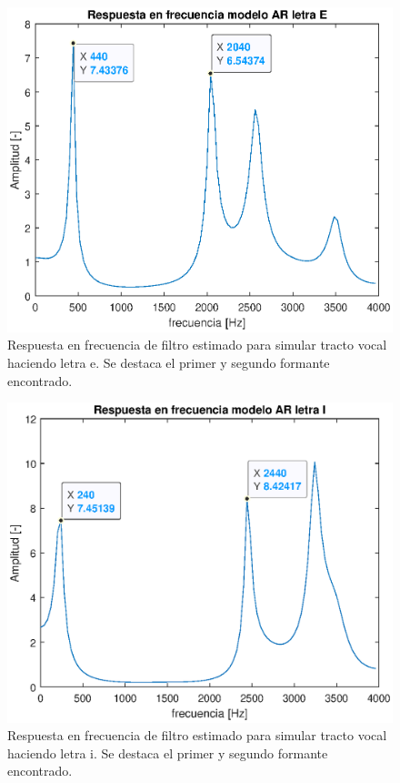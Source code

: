 \begin{figure}[H]
    \centering
    \includegraphics[width = .8\linewidth]{figures/p1_2e.eps}
    \caption{Respuesta en frecuencia de filtro estimado para simular tracto vocal haciendo letra e. Se destaca el primer y segundo formante encontrado.}
    \label{fig:p1_2e}
\end{figure}

\begin{figure}[H]
    \centering
    \includegraphics[width = .8\linewidth]{figures/p1_2i.eps}
    \caption{Respuesta en frecuencia de filtro estimado para simular tracto vocal haciendo letra i. Se destaca el primer y segundo formante encontrado.}
    \label{fig:p1_2i}
\end{figure}

